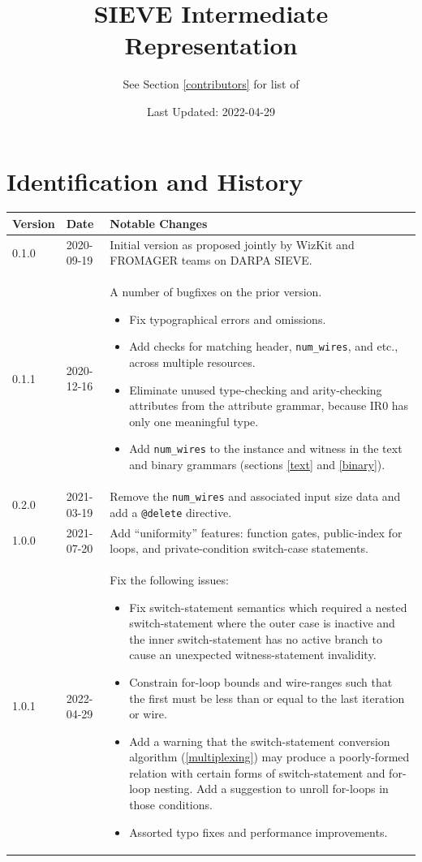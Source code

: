 \documentclass[12pt]{article}
\title{SIEVE Intermediate Representation}
\author{See Section \ref{contributors} for list of \nameref{contributors}}
\date{Last Updated: 2022-04-29}
\begin{document}
\maketitle

\section*{Identification and History}\label{history}

\begin{tabularx}{\textwidth}{|p{1in}|p{1in}|p{4in}|}
  \hline
  \textbf{Version} & \textbf{Date} & \textbf{Notable Changes} \\
  \hline
  0.1.0 & 2020-09-19 & Initial version as proposed jointly by WizKit and FROMAGER teams on DARPA SIEVE. \\
  \hline
  0.1.1
  & 2020-12-16 & A number of bugfixes on the prior version.
  \begin{itemize}
    \item Fix typographical errors and omissions.
    \item Add checks for matching header, \texttt{num\_wires}, and etc., across multiple resources.
    \item Eliminate unused type-checking and arity-checking attributes from the attribute grammar, because IR0 has only one meaningful type.
    \item Add \texttt{num\_wires} to the instance and witness in the text and binary grammars (sections \ref{text} and \ref{binary}).
  \end{itemize} \\
  \hline
  0.2.0 & 2021-03-19 & Remove the \texttt{num\_wires} and associated input size data and add a \texttt{@delete} directive. \\
  \hline
  1.0.0 & 2021-07-20 & Add ``uniformity'' features: function gates, public-index for loops, and private-condition switch-case statements. \\
  \hline
  1.0.1 & 2022-04-29 & Fix the following issues:
  \begin{itemize}
      \item Fix switch-statement semantics which required a nested switch-statement where the outer case is inactive and the inner switch-statement has no active branch to cause an unexpected witness-statement invalidity.
      \item Constrain for-loop bounds and wire-ranges such that the first must be less than or equal to the last iteration or wire.
      \item Add a warning that the switch-statement conversion algorithm (\ref{multiplexing}) may produce a poorly-formed relation with certain forms of switch-statement and for-loop nesting. Add a suggestion to unroll for-loops in those conditions.
      \item Assorted typo fixes and performance improvements.
  \end{itemize} \\
  \hline
\end{tabularx}
\end{document}
